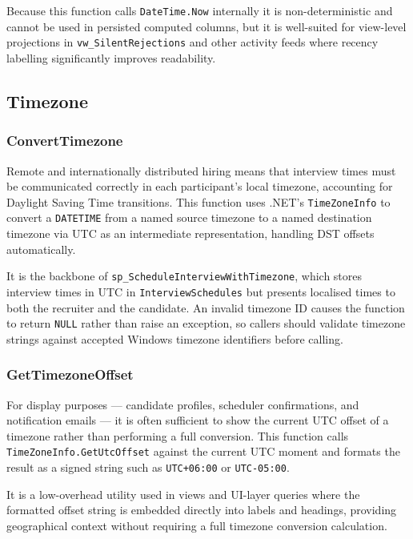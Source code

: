 \documentclass[11pt,a4paper]{article}
\begin{document}
Because this function calls \texttt{DateTime.Now} internally it is non-deterministic and cannot be used in persisted computed columns, but it is well-suited for view-level projections in \texttt{vw\_SilentRejections} and other activity feeds where recency labelling significantly improves readability.

\subsection{Timezone}

\subsubsection{ConvertTimezone}
\noindent
Remote and internationally distributed hiring means that interview times must be communicated correctly in each participant's local timezone, accounting for Daylight Saving Time transitions. This function uses .NET's \texttt{TimeZoneInfo} to convert a \texttt{DATETIME} from a named source timezone to a named destination timezone via UTC as an intermediate representation, handling DST offsets automatically.

It is the backbone of \texttt{sp\_ScheduleInterviewWithTimezone}, which stores interview times in UTC in \texttt{InterviewSchedules} but presents localised times to both the recruiter and the candidate. An invalid timezone ID causes the function to return \texttt{NULL} rather than raise an exception, so callers should validate timezone strings against accepted Windows timezone identifiers before calling.

\subsubsection{GetTimezoneOffset}
\noindent
For display purposes --- candidate profiles, scheduler confirmations, and notification emails --- it is often sufficient to show the current UTC offset of a timezone rather than performing a full conversion. This function calls \texttt{TimeZoneInfo.GetUtcOffset} against the current UTC moment and formats the result as a signed string such as \texttt{UTC+06:00} or \texttt{UTC-05:00}.

It is a low-overhead utility used in views and UI-layer queries where the formatted offset string is embedded directly into labels and headings, providing geographical context without requiring a full timezone conversion calculation.
\end{document}
